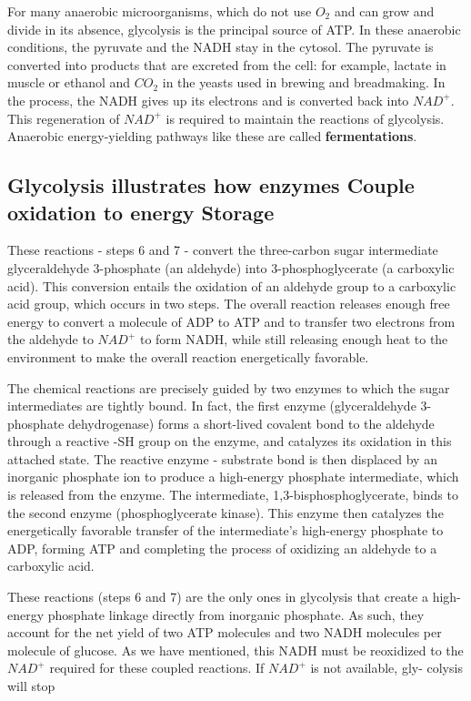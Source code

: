 For many anaerobic microorganisms,
which do not use $O_2$ and can grow and divide in its absence, glycolysis
is the principal source of ATP. In these anaerobic conditions, the pyruvate and the NADH stay in the
cytosol. The pyruvate is converted into products that are excreted from
the cell: for example, lactate in muscle or ethanol and $CO_2$ in the yeasts
used in brewing and breadmaking. In the process, the NADH gives up its
electrons and is converted back into $NAD^+$. This regeneration of $NAD^+$ is
required to maintain the reactions of glycolysis. Anaerobic
energy-yielding pathways like these are called \textbf{fermentations}.

\subsection{Glycolysis illustrates how enzymes Couple oxidation to energy Storage}

These reactions - steps 6 and 7 - convert the three-carbon sugar
intermediate glyceraldehyde 3-phosphate (an aldehyde) into
3-phosphoglycerate (a carboxylic acid). This conversion entails the oxidation
of an aldehyde group to a carboxylic acid group, which occurs in
two steps. The overall reaction releases enough free energy to convert a
molecule of ADP to ATP and to transfer two electrons from the aldehyde
to $NAD^+$ to form NADH, while still releasing enough heat to the environment
to make the overall reaction energetically favorable.

The chemical reactions are precisely guided by two enzymes to which the
sugar intermediates are tightly bound. In fact,
the first enzyme (glyceraldehyde 3-phosphate dehydrogenase) forms a
short-lived covalent bond to the aldehyde through a reactive -SH group
on the enzyme, and catalyzes its oxidation in this attached state. The
reactive enzyme - substrate bond is then displaced by an inorganic phosphate
ion to produce a high-energy phosphate intermediate, which is
released from the enzyme. The intermediate, 1,3-bisphosphoglycerate,
binds to the second enzyme (phosphoglycerate kinase). This enzyme
then catalyzes the energetically favorable transfer of the intermediate’s
high-energy phosphate to ADP, forming ATP and completing the process
of oxidizing an aldehyde to a carboxylic acid.

These reactions (steps 6 and 7) are the only ones in glycolysis that create a high-energy phosphate
linkage directly from inorganic phosphate. As such, they account for the
net yield of two ATP molecules and two NADH molecules per molecule
of glucose. As we have mentioned, this NADH must be reoxidized to the
$NAD^+$ required for these coupled reactions. If $NAD^+$ is not available, gly-
colysis will stop

